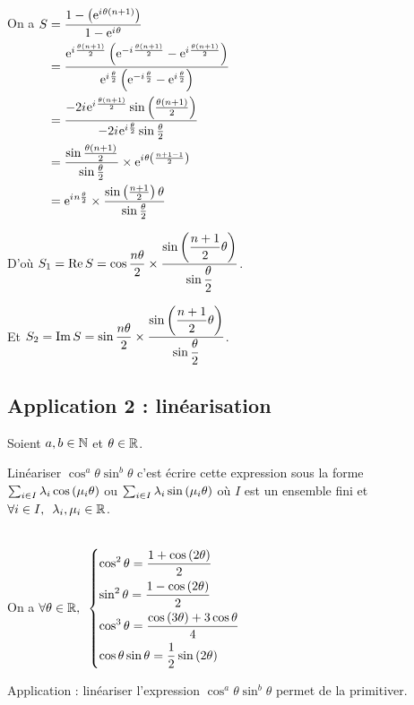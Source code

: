 On a \(\begin{aligned}[t]
S&=\dfrac{1-\left(\mathrm{e}^{i\mkern1mu\theta\left(n+1\right)}\right)}{1-\mathrm{e}^{i\mkern1mu\theta}} \\
&=\dfrac{\mathrm{e}^{i\mkern1mu\frac{\theta\left(n+1\right)}{2}}\left(\mathrm{e}^{-i\mkern1mu\frac{\theta\left(n+1\right)}{2}}-\mathrm{e}^{i\mkern1mu\frac{\theta\left(n+1\right)}{2}}\right)}{\mathrm{e}^{i\mkern1mu\frac{\theta}{2}}\left(\mathrm{e}^{-i\mkern1mu\frac{\theta}{2}}-\mathrm{e}^{i\mkern1mu\frac{\theta}{2}}\right)} \\
&=\dfrac{-2i\mkern1mu\mathrm{e}^{i\mkern1mu\frac{\theta\left(n+1\right)}{2}}\sin\left(\frac{\theta\left(n+1\right)}{2}\right)}{-2i\mkern1mu\mathrm{e}^{i\mkern1mu\frac{\theta}{2}}\sin\frac{\theta}{2}} \\
&=\dfrac{\sin\frac{\theta\left(n+1\right)}{2}}{\sin\frac{\theta}{2}}\times\mathrm{e}^{i\mkern1mu\theta\left(\frac{n+1-1}{2}\right)} \\
&=\mathrm{e}^{i\mkern1mu n\frac{\theta}{2}}\times\dfrac{\sin\left(\frac{n+1}{2}\right)\theta}{\sin\frac{\theta}{2}}
\end{aligned}\)

D'où \(S_1=\operatorname{Re} S=\cos\dfrac{n\theta}{2}\times\dfrac{\sin\left(\dfrac{n+1}{2}\theta\right)}{\sin\dfrac{\theta}{2}}\).

Et \(S_2=\operatorname{Im} S=\sin\dfrac{n\theta}{2}\times\dfrac{\sin\left(\dfrac{n+1}{2}\theta\right)}{\sin\dfrac{\theta}{2}}\).

\subsection{Application 2 : linéarisation}

Soient \(a,b\in\mathbb{N}\) et \(\theta\in\mathbb{R}\).

Linéariser \(\cos^a\theta\sin^b\theta\) c'est écrire cette expression sous la forme \(\sum_{i\in I}\lambda_i\cos\left(\mu_i\theta\right)\) ou \(\sum_{i\in I}\lambda_i\sin\left(\mu_i\theta\right)\) où \(I\) est un ensemble fini et \(\quantifs{\forall i\in I}\lambda_i,\mu_i\in\R\).

\begin{ex}~\\
On a \(\quantifs{\forall\theta\in\R}\begin{dcases}
\cos^2\theta=\dfrac{1+\cos\paren{2\theta}}{2} \\
\sin^2\theta=\dfrac{1-\cos\paren{2\theta}}{2} \\
\cos^3\theta=\dfrac{\cos\paren{3\theta}+3\cos\theta}{4} \\
\cos\theta\sin\theta=\dfrac{1}{2}\sin\paren{2\theta}
\end{dcases}\)
\end{ex}

Application : linéariser l'expression \(\cos^a\theta\sin^b\theta\) permet de la primitiver.

